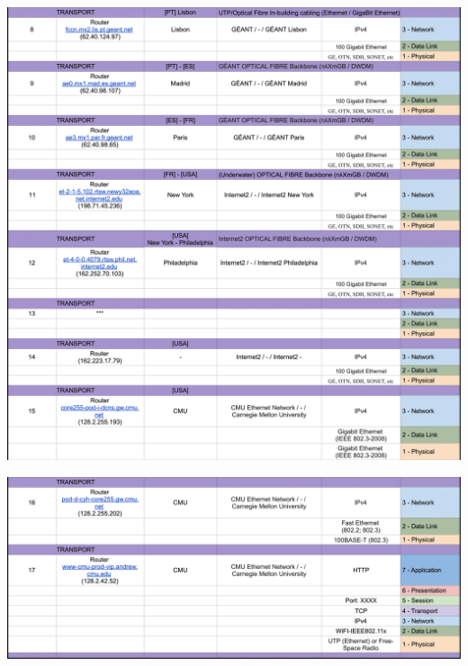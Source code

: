 \documentclass{article}
\begin{document}
\vspace*{\fill}
\begin{center}
    \includegraphics[width=1 \textwidth]{images/traceroute_part2.png}
\end{center}
\vspace*{\fill}\clearpage

\begin{center}
    \includegraphics[width=1 \textwidth]{images/traceroute_part3.png}
\end{center}

\nocite{*}
\printbibliography
\end{document}
